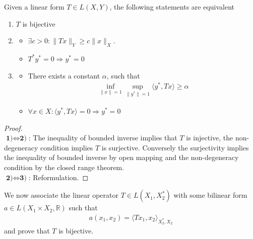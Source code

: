 \begin{corollary}
	Given a linear form $T \in L(X, Y)$, the following statements are equivalent
	\begin{enumerate}
		\item $T$ is bijective
		\item 
		\begin{itemize}
			\item $\exists c > 0: \|Tx \|_Y \ge  c \|x\|_X$.
			\item $T^* y^* = 0 \Rightarrow y^* = 0$
		\end{itemize}
		\item
		\begin{itemize}
			\item There exists a constant $\alpha$, such that
			\begin{align*}
			\inf_{\|x\| = 1} \sup_{\|y^*\| = 1} \langle y^*, Tx \rangle \ge \alpha
			\end{align*}
			\item $\forall x \in X: \langle y^*, Tx \rangle = 0 \Rightarrow y^* = 0$
		\end{itemize}
	\end{enumerate}
\end{corollary}
\begin{proof}\quad\\
	$\textbf{1)} \Leftrightarrow \textbf{2)}$: The inequality of bounded inverse implies that $T$ is injective, the non-degeneracy condition implies $T$ is surjective. Conversely the surjectivity implies the inequality of bounded inverse by open mapping and the non-degeneracy condition by the closed range theorem. \\
	$\textbf{2)} \Leftrightarrow \textbf{3)}$: Reformulation. 
\end{proof}

We now associate the linear operator $T \in L(X_1, X_2^*)$ with some bilinear form $a \in L(X_1 \times X_2, \mathbb{R})$ such that 
\begin{align*}
	a(x_1, x_2 ) = \langle T x_1, x_2 \rangle_{X_2^*, X_2} 
\end{align*}
and prove that $T$ is bijective. 

